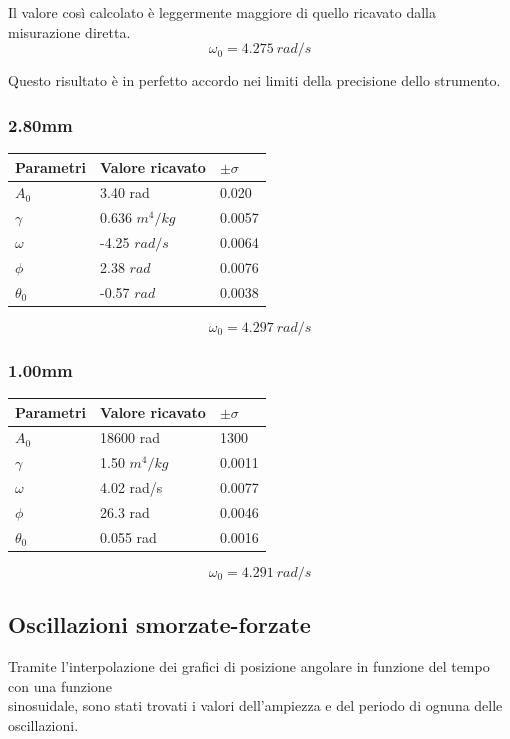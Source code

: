 \documentclass[a4paper,10pt]{report}
\begin{document}
Il valore così calcolato è leggermente maggiore di quello ricavato dalla misurazione diretta. $$\omega_{0} = 4.275\ rad/s$$

Questo risultato è in perfetto accordo nei limiti della precisione dello strumento.
\subsubsection{2.80mm}

\begin{center}
\begin{tabular}{l|l|l}
\midrule
Parametri & Valore ricavato & $ \pm \sigma$ \\
\midrule
$A_0$ & 3.40 rad & 0.020\\
$\gamma$ & 0.636 $m^4/kg$& 0.0057\\
$\omega$ & -4.25 $rad/s$& 0.0064\\
$\phi$ & 2.38 $rad$ & 0.0076 \\
$\theta_0$ & -0.57 $rad$& 0.0038 \\
\midrule
\end{tabular}
\end{center}

$$\omega_{0} = 4.297\ rad/s$$

\subsubsection{1.00mm}

\begin{center}
\begin{tabular}{l|l|l}
\midrule
Parametri & Valore ricavato & $ \pm \sigma$ \\
\midrule
$A_0$ & 18600 rad & 1300 \\
$\gamma$ & 1.50 $m^4/kg$& 0.0011\\
$\omega$ & 4.02 rad/s& 0.0077\\
$\phi$ & 26.3 rad & 0.0046 \\
$\theta_0$ & 0.055 rad& 0.0016 \\
\midrule
\end{tabular}
\end{center}

$$\omega_{0} = 4.291\ rad/s $$

\subsection{Oscillazioni smorzate-forzate}
Tramite l'interpolazione dei grafici di posizione angolare in funzione del tempo con una funzione\\
sinosuidale, sono stati trovati i valori dell'ampiezza e del periodo di ognuna delle oscillazioni.
\end{document}
